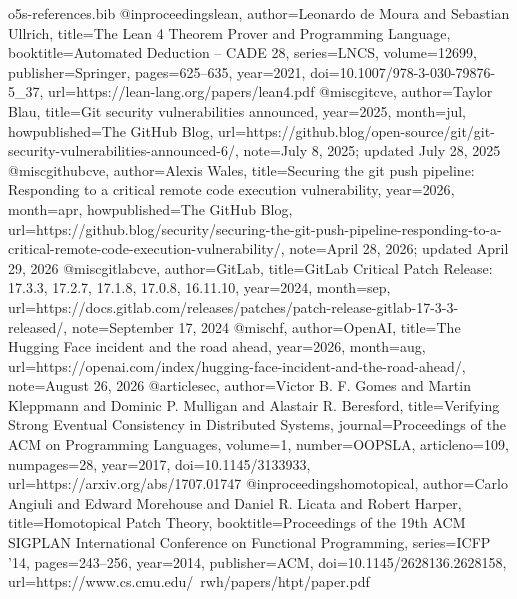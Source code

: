 \begin{filecontents*}[overwrite]{o5s-references.bib}
@inproceedings{lean, author={Leonardo de Moura and Sebastian Ullrich}, title={The Lean 4 Theorem Prover and Programming Language}, booktitle={Automated Deduction -- CADE 28}, series={LNCS}, volume={12699}, publisher={Springer}, pages={625--635}, year={2021}, doi={10.1007/978-3-030-79876-5_37}, url={https://lean-lang.org/papers/lean4.pdf}}
@misc{gitcve, author={Taylor Blau}, title={Git security vulnerabilities announced}, year={2025}, month=jul, howpublished={The GitHub Blog}, url={https://github.blog/open-source/git/git-security-vulnerabilities-announced-6/}, note={July 8, 2025; updated July 28, 2025}}
@misc{githubcve, author={Alexis Wales}, title={Securing the git push pipeline: Responding to a critical remote code execution vulnerability}, year={2026}, month=apr, howpublished={The GitHub Blog}, url={https://github.blog/security/securing-the-git-push-pipeline-responding-to-a-critical-remote-code-execution-vulnerability/}, note={April 28, 2026; updated April 29, 2026}}
@misc{gitlabcve, author={{GitLab}}, title={GitLab Critical Patch Release: 17.3.3, 17.2.7, 17.1.8, 17.0.8, 16.11.10}, year={2024}, month=sep, url={https://docs.gitlab.com/releases/patches/patch-release-gitlab-17-3-3-released/}, note={September 17, 2024}}
@misc{hf, author={{OpenAI}}, title={The Hugging Face incident and the road ahead}, year={2026}, month=aug, url={https://openai.com/index/hugging-face-incident-and-the-road-ahead/}, note={August 26, 2026}}
@article{sec, author={Victor B. F. Gomes and Martin Kleppmann and Dominic P. Mulligan and Alastair R. Beresford}, title={Verifying Strong Eventual Consistency in Distributed Systems}, journal={Proceedings of the ACM on Programming Languages}, volume={1}, number={OOPSLA}, articleno={109}, numpages={28}, year={2017}, doi={10.1145/3133933}, url={https://arxiv.org/abs/1707.01747}}
@inproceedings{homotopical, author={Carlo Angiuli and Edward Morehouse and Daniel R. Licata and Robert Harper}, title={Homotopical Patch Theory}, booktitle={Proceedings of the 19th ACM SIGPLAN International Conference on Functional Programming}, series={ICFP '14}, pages={243--256}, year={2014}, publisher={ACM}, doi={10.1145/2628136.2628158}, url={https://www.cs.cmu.edu/~rwh/papers/htpt/paper.pdf}}
\end{filecontents*}
\documentclass[sigconf,nonacm,pbalance=true]{acmart}
\usepackage{amsmath}
\usepackage{needspace}
\usepackage{booktabs}
\usepackage{enumitem}
\usepackage{tikz}
\usetikzlibrary{arrows.meta,positioning}
